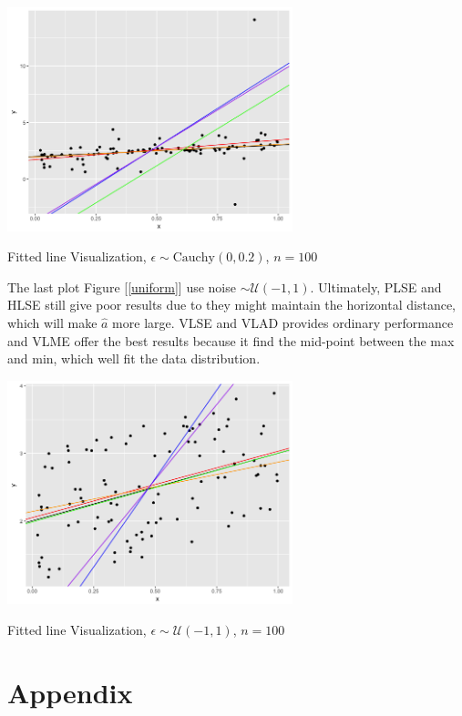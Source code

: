 \documentclass[twoside]{article}
\begin{document}
\begin{center}
\makeatletter
\def\@captype{figure}
\makeatother
\includegraphics [height=6.5cm]{code/sca/sca+cauchy.png}
\caption{Fitted line Visualization, $\epsilon \sim \mathrm{Cauchy}(0,0.2)$, $n=100$}
\label{cauchy}
\end{center}

The last plot Figure [\ref{uniform}] use noise $\sim \mathcal{U}(-1,1)$. Ultimately, PLSE and HLSE still give poor results due to they might maintain the horizontal distance, which will make $\hat{a}$ more large. VLSE and VLAD provides ordinary performance and VLME offer the best results because it find the mid-point between the max and min, which well fit the data distribution.

\begin{center}
\makeatletter
\def\@captype{figure}
\makeatother
\includegraphics [height=6.5cm]{code/sca/sca+uniform.png}
\caption{Fitted line Visualization, $\epsilon \sim \mathcal{U}(-1,1)$, $n=100$}
\label{uniform}
\end{center}

\section{Appendix}
\end{document}
